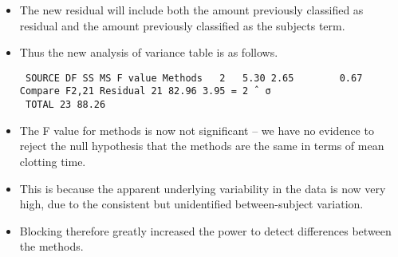 \documentclass[a4paper,12pt]{article}
\begin{document}
\begin{itemize}
    \item The new residual will include both the amount previously classified as residual and the amount previously classified as the subjects term.  
    \item Thus the new analysis of variance table is as follows. 
\begin{verbatim}    
 SOURCE DF SS MS F value Methods   2   5.30 2.65        0.67   Compare F2,21 Residual 21 82.96 3.95 = 2 ˆ σ
 TOTAL 23 88.26   
\end{verbatim} 
\item  The F value for methods is now not significant  –  we have no evidence to reject the null hypothesis that the methods are the same in terms of mean clotting time.  
\item This is because the apparent underlying variability in the data is now very high, due to the consistent but unidentified between-subject variation.  
\item Blocking therefore greatly increased the power to detect differences between the methods. 
\end{itemize}
 
 
\end{document}
